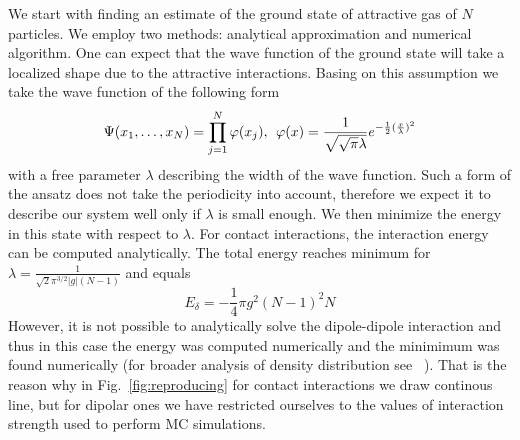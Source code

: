 \documentclass[aps,pra,reprint]{revtex4-2}
\begin{document}
We start with finding an estimate of the ground state of attractive gas of $N$ 
particles. We employ two methods: analytical approximation and numerical 
algorithm. One can expect that the wave function of the ground state will take 
a localized shape due to the attractive interactions. Basing on this assumption 
we take the wave function of the following form
\begin{equation}\label{eq:optimal}
\Psi(x_1 , \ldots , x_N) = \prod_{j=1}^N \varphi(x_j), \hspace{0.16cm} 
\varphi(x) = \frac{1}{\sqrt{\sqrt{\pi} \lambda}} 
e^{-\frac{1}{2}(\frac{x}{\lambda})^2}
\end{equation}
with a free parameter $\lambda$ describing the width of the wave function. 
Such a form of the ansatz does not take the periodicity into account, therefore 
we expect it to describe our system well only if $\lambda$ is small enough. We 
then minimize the energy in this state with respect to $\lambda$. For contact 
interactions, the interaction energy can be computed analytically. The total 
energy reaches minimum for $\lambda=\frac{1}{\sqrt{2} \pi^{3/2} |g| (N-1)}$ 
and equals
\begin{equation}
E_{\delta} = -\frac{1}{4} \pi g^2 (N-1)^2 N
\end{equation}
However, it is not possible to analytically solve the dipole-dipole interaction 
and thus in this case the energy was computed numerically and the minimimum was 
found numerically (for broader analysis of density distribution see
~\cite{Adhikari2012}). That is the reason why in Fig.~\ref{fig:reproducing} for 
contact interactions we draw continous line, but for dipolar ones we have 
restricted ourselves to the values of interaction strength used to perform MC 
simulations.
   
\end{document}
